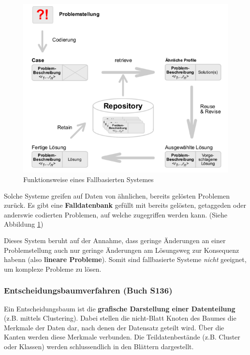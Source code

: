 \documentclass[a4paper, 11pt]{article}
\begin{document}
\begin{figure}
	\centering
	\includegraphics[keepaspectratio=true,height=12\baselineskip]{fallbasiert.png}
	\caption{Funktionsweise eines Fallbasierten Systemes}
	\label{fig:fallbasiert}
\end{figure}

Solche Systeme greifen auf Daten von ähnlichen, bereits gelösten Problemen zurück. Es gibt eine \textbf{Falldatenbank} gefüllt mit bereits gelösten, getaggeden oder anderswie codierten Problemen, auf welche zugegriffen werden kann. (Siehe Abbildung \ref{fig:fallbasiert})

Dieses System beruht auf der Annahme, dass geringe Änderungen an einer Problemstellung auch nur geringe Änderungen am Lösungsweg zur Konsequenz habenn (also \textbf{lineare Probleme}). Somit sind fallbasierte Systeme \textit{nicht} geeignet, um komplexe Probleme zu lösen.

\newpage

\subsubsection{Entscheidungsbaumverfahren (Buch S136)}
Ein Entscheidungsbaum ist die \textbf{grafische Darstellung einer Datenteilung} (z.B. mittels Clustering). Dabei stellen die nicht-Blatt Knoten des Baumes die Merkmale der Daten dar, nach denen der Datensatz geteilt wird. Über die Kanten werden diese Merkmale verbunden. Die Teildatenbestände (z.B. Cluster oder Klassen) werden schlussendlich in den Blättern dargestellt.
\end{document}
